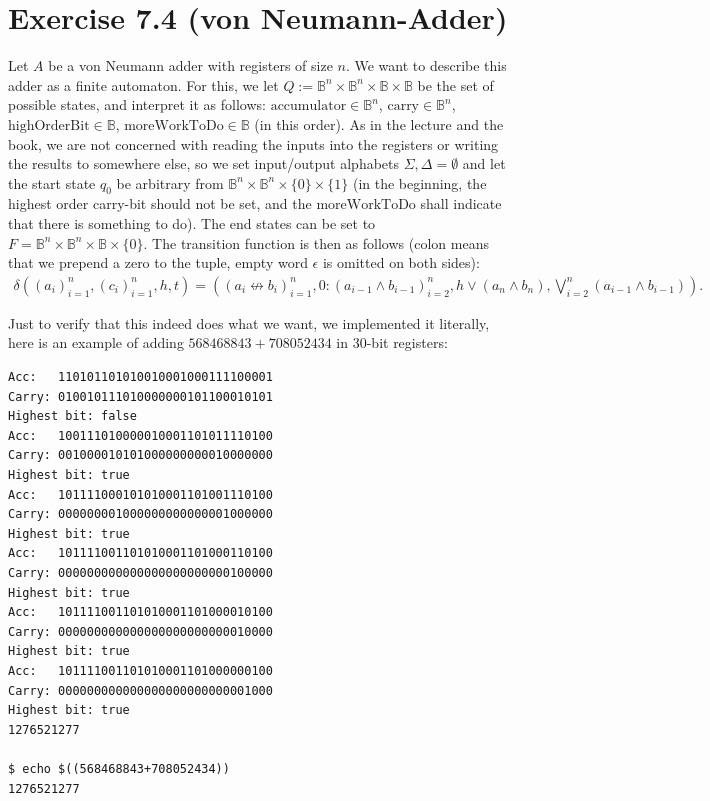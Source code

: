 \documentclass[10pt,a4paper]{scrartcl}
\newcommand{\B}{\mathbb{B}}
\begin{document}
\section*{Exercise 7.4 (von Neumann-Adder)}
Let $A$ be a von Neumann adder with registers of size $n$.
We want to describe this adder as a finite automaton.
For this, we let $Q:=\B^n\times\B^n\times\B\times\B$ be the set of possible states, 
and interpret it as follows: 
$\textrm{accumulator}\in \B^n$, 
$\textrm{carry}\in \B^n$, 
$\textrm{highOrderBit}\in \B$,
$\textrm{moreWorkToDo}\in \B$ 
(in this order). As in the lecture and the book, we are not concerned with reading
the inputs into the registers or writing the results to somewhere else, so we set
input/output alphabets $\Sigma, \Delta = \emptyset$ and let the start state $q_0$ be
arbitrary from $\B^n\times\B^n\times\{0\}\times\{1\}$ (in the beginning, the highest
order carry-bit should not be set, and the $\textrm{moreWorkToDo}$ shall indicate 
that there is something to do).
The end states can be set to $F=\B^n\times\B^n\times\B\times\{0\}$. 
The transition function is then as follows (colon means that we prepend a zero to the tuple, empty word $\epsilon$ is omitted on both sides):
\begin{align*}
  \delta\left(
    (a_i)_{i=1}^n,
    (c_i)_{i=1}^n,
    h,
    t
  \right) 
  =
  \left(
    (a_i \not\leftrightarrow b_i)_{i=1}^n,
    0 : (a_{i-1} \wedge b_{i-1})_{i=2}^n,
    h \vee (a_n \wedge b_n),
    \bigvee_{i=2}^n(a_{i-1} \wedge b_{i-1})
  \right).
\end{align*}

Just to verify that this indeed does what we want, we implemented it literally, here is an
example of adding $568468843+708052434$ in 30-bit registers:
\begin{verbatim}
Acc:   110101101010010001000111100001
Carry: 010010111010000000101100010101
Highest bit: false
Acc:   100111010000010001101011110100
Carry: 001000010101000000000010000000
Highest bit: true
Acc:   101111000101010001101001110100
Carry: 000000001000000000000001000000
Highest bit: true
Acc:   101111001101010001101000110100
Carry: 000000000000000000000000100000
Highest bit: true
Acc:   101111001101010001101000010100
Carry: 000000000000000000000000010000
Highest bit: true
Acc:   101111001101010001101000000100
Carry: 000000000000000000000000001000
Highest bit: true
1276521277

$ echo $((568468843+708052434))
1276521277
\end{verbatim}
\end{document}
